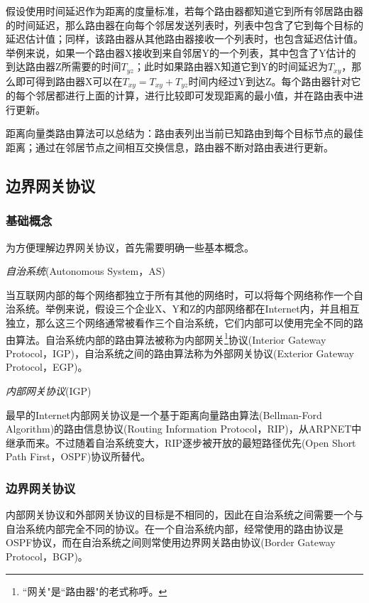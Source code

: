\documentclass[11pt,twocolumn]{article}
\begin{document}
假设使用时间延迟作为距离的度量标准，若每个路由器都知道它到所有邻居路由器的时间延迟，那么路由器在向每个邻居发送列表时，列表中包含了它到每个目标的延迟估计值；同样，该路由器从其他路由器接收一个列表时，也包含延迟估计值。举例来说，如果一个路由器X接收到来自邻居Y的一个列表，其中包含了Y估计的到达路由器Z所需要的时间$T_{yz}$；此时如果路由器X知道它到Y的时间延迟为$T_{xy}$，那么即可得到路由器X可以在$T_{xy}=T_{xy}+T_{yz}$时间内经过Y到达Z。每个路由器针对它的每个邻居都进行上面的计算，进行比较即可发现距离的最小值，并在路由表中进行更新。

距离向量类路由算法可以总结为：路由表列出当前已知路由到每个目标节点的最佳距离；通过在邻居节点之间相互交换信息，路由器不断对路由表进行更新。

\subsection{边界网关协议}

\subsubsection{基础概念}
为方便理解边界网关协议，首先需要明确一些基本概念。

\noindent\emph{自治系统}(Autonomous System，AS)

当互联网内部的每个网络都独立于所有其他的网络时，可以将每个网络称作一个自治系统\cite{AS}。举例来说，假设三个企业X、Y和Z的内部网络都在Internet内，并且相互独立，那么这三个网络通常被看作三个自治系统，它们内部可以使用完全不同的路由算法。自治系统内部的路由算法被称为内部网关\footnote{``网关"是``路由器"的老式称呼。}协议(Interior Gateway Protocol，IGP)，自治系统之间的路由算法称为外部网关协议(Exterior Gateway Protocol，EGP)。

\noindent\emph{内部网关协议}(IGP)

最早的Internet内部网关协议是一个基于距离向量路由算法(Bellman-Ford Algorithm)的路由信息协议(Routing Information Protocol，RIP)\cite{CN}，从ARPNET中继承而来。不过随着自治系统变大，RIP逐步被开放的最短路径优先(Open Short Path First，OSPF)协议所替代。

\subsubsection{边界网关协议}

内部网关协议和外部网关协议的目标是不相同的，因此在自治系统之间需要一个与自治系统内部完全不同的协议。在一个自治系统内部，经常使用的路由协议是OSPF协议，而在自治系统之间则常使用边界网关路由协议(Border Gateway Protocol，BGP)。
\end{document}
